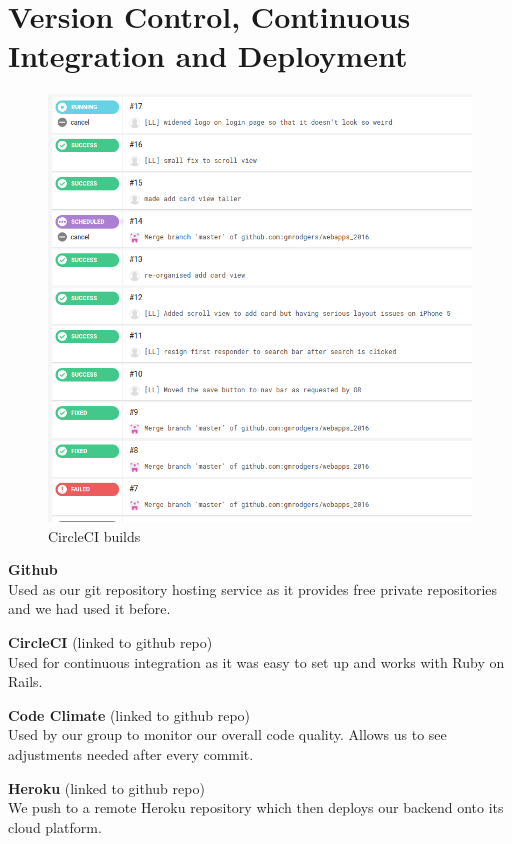 \documentclass[a4wide, 11pt]{article}
\begin{document}
\section{Version Control, Continuous Integration and Deployment}
\begin{itemize}
    \parbox[t]{\dimexpr\textwidth-\leftmargin}{%
      \vspace{-2.5mm}
      \begin{figure}
        \centering
        \vspace{-\baselineskip}
		\includegraphics[scale=0.25]{builds.png}
        \caption{CircleCI builds}
      \end{figure}
\item \textbf{Github}\\
Used as our git repository hosting service as it provides free private repositories and we had used it before.
\item \textbf{CircleCI} (linked to github repo)\\
Used for continuous integration as it was easy to set up and works with Ruby on Rails.
\item \textbf{Code Climate} (linked to github repo)\\
Used by our group to monitor our overall code quality.  Allows us to see adjustments needed after every commit.
\item \textbf{Heroku} (linked to github repo)\\
We push to a remote Heroku repository which then deploys our backend onto its 
cloud platform.
    }
  \end{itemize}
\end{document}
